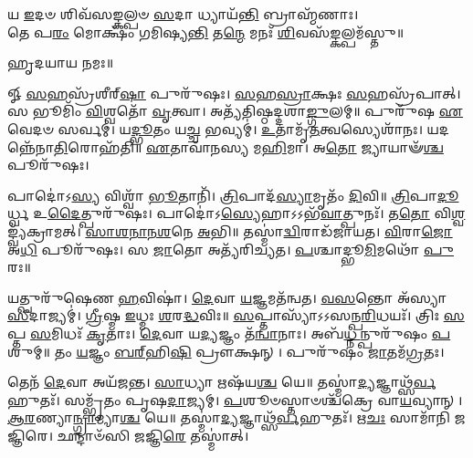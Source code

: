 \begin{center}


𑌯 \ul{𑌇}\-𑌦𑍞 𑌶𑌿𑌵᳴𑌸𑌙𑍍𑌕𑌲𑍍𑌪𑍞 \ul{𑌸}\-𑌦𑌾 𑌧𑍍𑌯𑌾𑌯᳴\-\ul{𑌨𑍍𑌤𑌿} 𑌬𑍍𑌰𑌾𑌹𑍍𑌮᳴𑌣𑌾𑌃।\\
 𑌤𑍇 𑌪\-\ul{𑌰𑌂} 𑌮𑍋𑌕𑍍𑌷𑌂᳴ 𑌗𑌮𑌿𑌷𑍍𑌯\-\ul{𑌨𑍍𑌤𑌿} 𑌤\-\ul{𑌨𑍍𑌮𑍇} 𑌮𑌨𑌃᳴ \ul{𑌶𑌿}\-𑌵𑌸᳴\-\ul{𑌙𑍍𑌕}\-𑌲𑍍𑌪𑌮᳴𑌸𑍍𑌤𑍁॥

𑌹𑍃𑌦𑌯𑌾𑌯 𑌨𑌮𑌃॥
\end{center}
{\small \closesection}

𑍐 \ul{𑌸}\-𑌹𑌸𑍍𑌰᳴𑌶𑍀𑌰𑍍‌\-\ul{𑌷𑌾} 𑌪𑍁𑌰𑍁᳴𑌷𑌃। \ul{𑌸}\-\-\ul{𑌹}\-\-\ul{𑌸𑍍𑌰𑌾}\-𑌕𑍍𑌷𑌃 \ul{𑌸}\-𑌹𑌸𑍍𑌰᳴𑌪𑌾𑌤𑍍। 𑌸 𑌭𑍂𑌮𑌿𑌂᳴ \ul{𑌵𑌿}\-𑌶𑍍𑌵𑌤𑍋᳴ \ul{𑌵𑍃}\-𑌤𑍍𑌵𑌾। 𑌅𑌤𑍍𑌯᳴𑌤𑌿𑌷𑍍𑌠𑌦𑍍𑌦𑌶𑌾\-\ul{𑌙𑍍𑌗𑍁}\-𑌲𑌮𑍍॥ 𑌪𑍁𑌰𑍁᳴𑌷 \ul{𑌏}\-𑌵𑍇𑌦𑍞 𑌸𑌰𑍍𑌵𑌮𑍍॑। 𑌯\-\ul{𑌦𑍍𑌭𑍂}\-𑌤𑌂 𑌯\-\ul{𑌚𑍍𑌚} 𑌭𑌵𑍍𑌯𑌮𑍍॑। \ul{𑌉}\-𑌤𑌾𑌮𑍃᳴\-\ul{𑌤}\-𑌤𑍍𑌵𑌸𑍍𑌯𑍇𑌶𑌾᳴𑌨𑌃। 𑌯𑌦𑌨𑍍𑌨𑍇᳴𑌨𑌾\-\ul{𑌤𑌿}\-𑌰𑍋𑌹᳴𑌤𑌿॥ \ul{𑌏}\-𑌤𑌾𑌵𑌾᳴𑌨𑌸𑍍𑌯 𑌮\-\ul{𑌹𑌿}\-𑌮𑌾। 𑌅\-\ul{𑌤𑍋} 𑌜𑍍𑌯𑌾𑌯𑌾𑍟᳴\-\ul{𑌶𑍍𑌚} 𑌪𑍂𑌰𑍁᳴𑌷𑌃।

 𑌪𑌾𑌦𑍋॑𑌽\-\ul{𑌸𑍍𑌯} 𑌵𑌿𑌶𑍍𑌵𑌾᳴ \ul{𑌭𑍂}\-𑌤𑌾𑌨𑌿᳴। \ul{𑌤𑍍𑌰𑌿}\-𑌪𑌾𑌦᳴\-\ul{𑌸𑍍𑌯𑌾}\-𑌮𑍃𑌤𑌂᳴ \ul{𑌦𑌿}\-𑌵𑌿॥ \ul{𑌤𑍍𑌰𑌿}\-𑌪𑌾\-\ul{𑌦𑍂}\-𑌰𑍍𑌧𑍍𑌵 𑌉\-\ul{𑌦𑍈}\-𑌤𑍍𑌪𑍁𑌰𑍁᳴𑌷𑌃। 𑌪𑌾𑌦𑍋॑𑌽\-\ul{𑌸𑍍𑌯𑍇}\-𑌹𑌾𑌽𑌽𑌭᳴\-\ul{𑌵𑌾}\-𑌤𑍍𑌪𑍁𑌨𑌃᳴। 𑌤\-\ul{𑌤𑍋} 𑌵𑌿\-\ul{𑌶𑍍𑌵}\-𑌙𑍍𑌵𑍍𑌯᳴𑌕𑍍𑌰𑌾𑌮𑌤𑍍। \ul{𑌸𑌾}\-\-\ul{𑌶}\-\-\ul{𑌨𑌾}\-\-\ul{𑌨}\-\-\ul{𑌶}\-𑌨𑍇 \ul{𑌅}\-𑌭𑌿॥ 𑌤𑌸𑍍𑌮𑌾॑\-\ul{𑌦𑍍𑌵𑌿}\-𑌰𑌾𑌡᳴𑌜𑌾𑌯𑌤। \ul{𑌵𑌿}\-𑌰𑌾\-\ul{𑌜𑍋} 𑌅\-\ul{𑌧𑌿} 𑌪𑍂𑌰𑍁᳴𑌷𑌃। 𑌸 \ul{𑌜𑌾}\-𑌤𑍋 𑌅𑌤𑍍𑌯᳴𑌰𑌿𑌚𑍍𑌯𑌤। \ul{𑌪}\-𑌶𑍍𑌚𑌾𑌦𑍍𑌭𑍂\-\ul{𑌮𑌿}\-𑌮𑌥𑍋᳴ \ul{𑌪𑍁}\-𑌰𑌃॥

 𑌯𑌤𑍍𑌪𑍁𑌰𑍁᳴𑌷𑍇𑌣 \ul{𑌹}\-𑌵𑌿𑌷𑌾॑। \ul{𑌦𑍇}\-𑌵𑌾 \ul{𑌯}\-𑌜𑍍𑌞𑌮𑌤᳴𑌨𑍍𑌵𑌤। \ul{𑌵}\-\-\ul{𑌸}\-𑌨𑍍𑌤𑍋 𑌅᳴𑌸𑍍𑌯𑌾\-\ul{𑌸𑍀}\-𑌦𑌾𑌜𑍍𑌯𑌮𑍍॑। \ul{𑌗𑍍𑌰𑍀}\-𑌷𑍍𑌮 \ul{𑌇}\-𑌧𑍍𑌮𑌃 \ul{𑌶}\-𑌰\-\ul{𑌦𑍍𑌧}\-𑌵𑌿𑌃॥ \ul{𑌸}\-𑌪𑍍𑌤𑌾𑌸𑍍𑌯𑌾᳴𑌽𑌽\-𑌸𑌨𑍍𑌪\-\ul{𑌰𑌿}\-𑌧𑌯𑌃᳴। 𑌤𑍍𑌰𑌿𑌃 \ul{𑌸}\-𑌪𑍍𑌤 \ul{𑌸}\-𑌮𑌿𑌧𑌃᳴ \ul{𑌕𑍃}\-𑌤𑌾𑌃। \ul{𑌦𑍇}\-𑌵𑌾 𑌯\-\ul{𑌦𑍍𑌯}\-𑌜𑍍𑌞𑌂 𑌤᳴\-\ul{𑌨𑍍𑌵𑌾}\-𑌨𑌾𑌃। 𑌅𑌬᳴\-\ul{𑌧𑍍𑌨}\-𑌨𑍍𑌪𑍁𑌰𑍁᳴𑌷𑌂 \ul{𑌪}\-𑌶𑍁𑌮𑍍॥ 𑌤𑌂 \ul{𑌯}\-𑌜𑍍𑌞𑌂 \ul{𑌬}\-\ul{𑌰𑍍}‌𑌹𑌿\-\ul{𑌷𑌿} 𑌪𑍍𑌰𑍗𑌕𑍍𑌷𑌨𑍍। 𑌪𑍁𑌰𑍁᳴𑌷𑌂 \ul{𑌜𑌾}\-𑌤𑌮᳴\-\ul{𑌗𑍍𑌰}\-𑌤𑌃।

 𑌤𑍇𑌨᳴ \ul{𑌦𑍇}\-𑌵𑌾 𑌅𑌯᳴𑌜𑌨𑍍𑌤। \ul{𑌸𑌾}\-𑌧𑍍𑌯𑌾 𑌋𑌷᳴𑌯\-\ul{𑌶𑍍𑌚} 𑌯𑍇॥ 𑌤𑌸𑍍𑌮𑌾॑\-\ul{𑌦𑍍𑌯}\-𑌜𑍍𑌞𑌾𑌥𑍍𑌸᳴\-\ul{𑌰𑍍𑌵}\-\-𑌹𑍁𑌤𑌃᳴। 𑌸𑌮𑍍𑌭𑍃᳴𑌤𑌂 𑌪𑍃𑌷\-\ul{𑌦𑌾}\-𑌜𑍍𑌯𑌮𑍍। \ul{𑌪}\-𑌶𑍂𑍞𑌸𑍍𑌤𑌾𑍞𑌶𑍍𑌚᳴𑌕𑍍𑌰𑍇 𑌵𑌾\-\ul{𑌯}\-𑌵𑍍𑌯𑌾𑌨𑍍। \ul{𑌆}\-\-\ul{𑌰}\-𑌣𑍍𑌯𑌾\-\ul{𑌨𑍍𑌗𑍍𑌰𑌾}\-𑌮𑍍𑌯𑌾\-\ul{𑌶𑍍𑌚} 𑌯𑍇॥ 𑌤𑌸𑍍𑌮𑌾॑\-\ul{𑌦𑍍𑌯}\-𑌜𑍍𑌞𑌾𑌥𑍍𑌸᳴\-\ul{𑌰𑍍𑌵}\-𑌹𑍁𑌤𑌃᳴। 𑌋\-\ul{𑌚𑌃} 𑌸𑌾𑌮𑌾᳴𑌨𑌿 𑌜𑌜𑍍𑌞𑌿𑌰𑍇। 𑌛𑌨𑍍𑌦𑌾𑍞᳴𑌸𑌿 𑌜𑌜𑍍𑌞𑌿\-\ul{𑌰𑍇} 𑌤𑌸𑍍𑌮𑌾॑𑌤𑍍।

